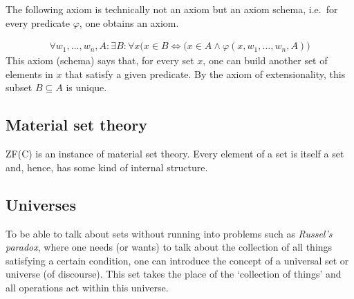     The following axiom is technically not an axiom but an axiom schema, i.e.~for every predicate $\varphi$, one obtains an axiom.
    \begin{axiom}[Specification]
        \begin{gather}
            \forall w_1,\ldots,w_n,A:\exists B:\forall x\bigl(x\in B\iff(x\in A\land\varphi(x,w_1,\ldots,w_n,A)\bigr)
        \end{gather}
        This axiom (schema) says that, for every set $x$, one can build another set of elements in $x$ that satisfy a given predicate. By the axiom of extensionality, this subset $B\subseteq A$ is unique.
    \end{axiom}

\subsection{Material set theory}

    ZF(C) is an instance of material set theory. Every element of a set is itself a set and, hence, has some kind of internal structure.


\subsection{Universes}\label{section:universes}

    To be able to talk about sets without running into problems such as \textit{Russel's paradox}, where one needs (or wants) to talk about the collection of all things satisfying a certain condition, one can introduce the concept of a universal set or universe (of discourse). This set takes the place of the `collection of things' and all operations act within this universe.


